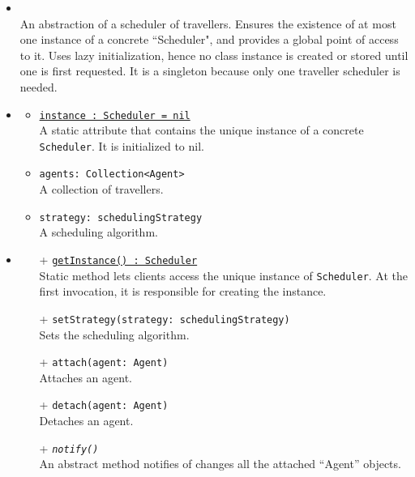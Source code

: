 \begin{itemize}
  \item \textbf{\descr} \\
  An abstraction of a scheduler of travellers.
  Ensures the existence of at most one instance of a concrete ``Scheduler", 
  and provides a global point of access to it.
  Uses lazy initialization, hence no class instance is created 
  or stored until one is first requested.
  It is a singleton because only one traveller scheduler is needed.
  \item \textbf{\attrs}
  \begin{itemize}
    \item \texttt{\underline{instance : Scheduler = nil}} \\
    A static attribute that contains the unique instance 
    of a concrete \texttt{Scheduler}. It is initialized to nil.
    \item \texttt{agents: Collection<Agent>} \\
	A collection of travellers.
	\item \texttt{strategy: schedulingStrategy} \\
	A scheduling algorithm.
  \end{itemize}
  \item \textbf{\ops}
  \begin{itemize}
    \item[+] \texttt{\underline{getInstance() : Scheduler}} \\
    Static method lets clients access the unique instance 
    of \texttt{Scheduler}. At the first invocation, it is responsible 
    for creating the instance.
    \item[+] \texttt{setStrategy(strategy: schedulingStrategy)} \\
    Sets the scheduling algorithm.
    \item[+] \texttt{attach(agent: Agent)} \\
    Attaches an agent.
	\item[+] \texttt{detach(agent: Agent)} \\
	Detaches an agent.
	\item[+] \texttt{\textit{notify()}} \\
	An abstract method notifies of changes all the attached ``Agent'' objects.
  \end{itemize}
\end{itemize}

